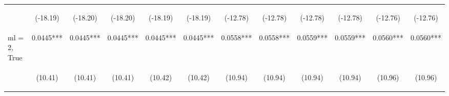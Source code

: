 \documentclass[]{article}
\begin{document}
\begin{center}
\begin{tabular}{lccccccccccc}
\vspace{4pt} & \begin{footnotesize}(-18.19)\end{footnotesize} & \begin{footnotesize}(-18.20)\end{footnotesize} & \begin{footnotesize}(-18.20)\end{footnotesize} & \begin{footnotesize}(-18.19)\end{footnotesize} & \begin{footnotesize}(-18.19)\end{footnotesize} & \begin{footnotesize}(-12.78)\end{footnotesize} & \begin{footnotesize}(-12.78)\end{footnotesize} & \begin{footnotesize}(-12.78)\end{footnotesize} & \begin{footnotesize}(-12.78)\end{footnotesize} & \begin{footnotesize}(-12.76)\end{footnotesize} & \begin{footnotesize}(-12.76)\end{footnotesize} \\
ml = 2, True & 0.0445*** & 0.0445*** & 0.0445*** & 0.0445*** & 0.0445*** & 0.0558*** & 0.0558*** & 0.0559*** & 0.0559*** & 0.0560*** & 0.0560*** \\
\vspace{4pt} & \begin{footnotesize}(10.41)\end{footnotesize} & \begin{footnotesize}(10.41)\end{footnotesize} & \begin{footnotesize}(10.41)\end{footnotesize} & \begin{footnotesize}(10.42)\end{footnotesize} & \begin{footnotesize}(10.42)\end{footnotesize} & \begin{footnotesize}(10.94)\end{footnotesize} & \begin{footnotesize}(10.94)\end{footnotesize} & \begin{footnotesize}(10.94)\end{footnotesize} & \begin{footnotesize}(10.94)\end{footnotesize} & \begin{footnotesize}(10.96)\end{footnotesize} & \begin{footnotesize}(10.96)\end{footnotesize} \\

\end{tabular}
\end{center}
\end{document}
